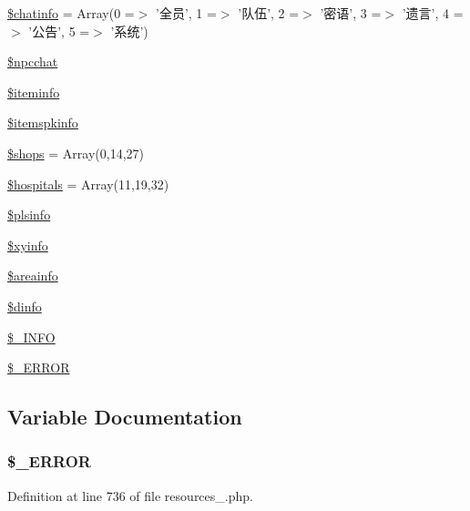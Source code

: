 \begin{DoxyCompactItemize}
\item 
\hyperlink{resources__1_8php_abcea2ccdba90758edbd052712f3b2cec}{\$chatinfo} = Array(0 =$>$ '全员', 1 =$>$ '队伍', 2 =$>$ '密语', 3 =$>$ '遗言', 4 =$>$ '公告', 5 =$>$ '系统')
\item 
\hyperlink{resources__1_8php_a413262abf345c0466e9927a412571365}{\$npcchat}
\item 
\hyperlink{resources__1_8php_abf61f517048be2c7cc3d9c24e62f1160}{\$iteminfo}
\item 
\hyperlink{resources__1_8php_af5da654ca4941efa7e59e9608ad80106}{\$itemspkinfo}
\item 
\hyperlink{resources__1_8php_a6a4f6f4fa7edf238e168beb18f0870af}{\$shops} = Array(0,14,27)
\item 
\hyperlink{resources__1_8php_a522f774b7af7274c8142c2bf00854709}{\$hospitals} = Array(11,19,32)
\item 
\hyperlink{resources__1_8php_a80fc03ebf0cae6b56b4e8f4738273199}{\$plsinfo}
\item 
\hyperlink{resources__1_8php_aabc8b00fb3b56eab2f2d6ff8e1f0839c}{\$xyinfo}
\item 
\hyperlink{resources__1_8php_aabf13bd9fe14d8a463c5f4b334361291}{\$areainfo}
\item 
\hyperlink{resources__1_8php_a9640d994c06710b77fc93ddf4f99f50f}{\$dinfo}
\item 
\hyperlink{resources__1_8php_acc171a42cb2c06ea14b041fc55b5cc24}{\$\+\_\+\+I\+N\+F\+O}
\item 
\hyperlink{resources__1_8php_a07754cf9f14d6271b746015934a7753e}{\$\+\_\+\+E\+R\+R\+O\+R}
\end{DoxyCompactItemize}


\subsection{Variable Documentation}
\hypertarget{resources__1_8php_a07754cf9f14d6271b746015934a7753e}{
\subsubsection[{\$\+\_\+\+E\+R\+R\+O\+R}]{\setlength{\rightskip}{0pt plus 5cm}\$\+\_\+\+E\+R\+R\+O\+R}}\label{resources__1_8php_a07754cf9f14d6271b746015934a7753e}


Definition at line 736 of file resources\+\_.\+php.

